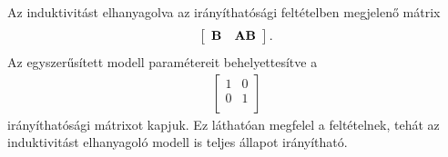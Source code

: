 Az induktivitást elhanyagolva az irányíthatósági feltételben megjelenő mátrix 
\begin{align}
    \left[\begin{array}{c|c}
        \mathbf{B} & \mathbf{AB}
    \end{array}\right].
\end{align}
Az egyszerűsített modell paramétereit behelyettesítve 
a
\begin{align}
    \begin{bmatrix}
        1 & 0 \\
        0 & 1 \\
    \end{bmatrix}
\end{align}
irányíthatósági mátrixot kapjuk.
Ez láthatóan megfelel a feltételnek, tehát az induktivitást elhanyagoló modell is teljes állapot irányítható.


